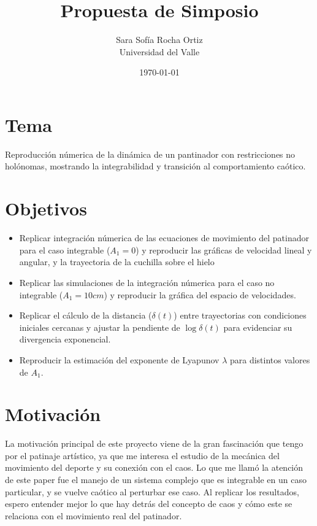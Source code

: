 \documentclass[12pt]{article}
\title{Propuesta de Simposio}
\author{Sara Sofía Rocha Ortiz \\ Universidad del Valle}
\date{\today}
\begin{document}
	\maketitle
	
	\section*{Tema }
	
	Reproducción númerica de la dinámica de un pantinador con restricciones no holónomas, mostrando la integrabilidad y transición al comportamiento caótico. 
	
	
	
	
	\section*{Objetivos}

	\begin{itemize}
		\item Replicar integración númerica de las ecuaciones de movimiento del patinador para el caso integrable ($A_1=0$) y reproducir las gráficas de velocidad lineal y angular, y la trayectoria de la cuchilla sobre el hielo
		\item Replicar las simulaciones de la integración númerica para el caso no integrable ($A_1=10 cm$) y reproducir la gráfica del espacio de velocidades.
		\item Replicar el cálculo de la distancia ($\delta(t)$) entre trayectorias con condiciones iniciales cercanas y ajustar la pendiente de $\log \delta(t)$ para evidenciar su divergencia exponencial.
		\item Reproducir la estimación del exponente de Lyapunov $\lambda$ para distintos valores de $A_1$.
	\end{itemize}
	
	

	\section*{Motivación}
La motivación principal de este proyecto viene de la gran fascinación que tengo por el patinaje artístico, ya que me interesa el estudio de la mecánica del movimiento del deporte y su conexión con el caos. Lo que me llamó la atención de este paper fue el manejo de un sistema complejo que es integrable en un caso particular, y se vuelve caótico al perturbar ese caso. Al replicar los resultados, espero entender mejor lo que hay detrás del concepto de caos y cómo este se relaciona con el movimiento real del patinador. 
\end{document}
